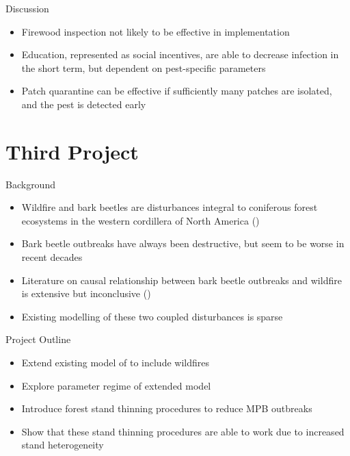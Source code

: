 \documentclass{beamer}
\begin{document}
\begin{frame}{Discussion}
    \begin{itemize}
        \item Firewood inspection not likely to be effective in implementation
        \item Education, represented as social incentives, are able to decrease infection in the short term, but dependent on pest-specific parameters
        \item Patch quarantine can be effective if sufficiently many patches are isolated, and the pest is detected early 
    \end{itemize}
\end{frame}

\section{Third Project}
\begin{frame}{Background}
    \begin{itemize}
        \item Wildfire and bark beetles are disturbances integral to coniferous forest ecosystems in the western cordillera of North America (\cite{kaufmann2008status})
        \item Bark beetle outbreaks have always been destructive, but seem to be worse in recent decades
        \item Literature on causal relationship between bark beetle outbreaks and wildfire is extensive but inconclusive (\citet{axelson2009influence})
        \item Existing modelling of these two coupled disturbances is sparse
    \end{itemize}
\end{frame}

\begin{frame}{Project Outline}

    \begin{itemize}
        \item Extend existing model of \citet{duncan2015model} to include wildfires 
        \item Explore parameter regime of extended model
        \item Introduce forest stand thinning procedures to reduce MPB outbreaks
        \item Show that these stand thinning procedures are able to work due to increased stand heterogeneity 
    \end{itemize}
    
\end{frame}
\end{document}
